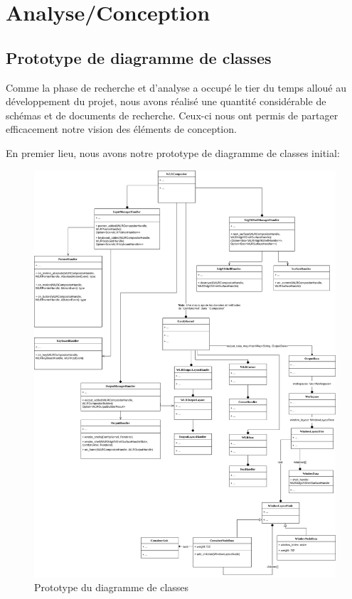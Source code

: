 \documentclass[titlepage]{article}
\begin{document}
\noindent\begin{minipage}{\linewidth}
\section{Analyse/Conception}
\subsection{Prototype de diagramme de classes}
\par
Comme la phase de recherche et d'analyse a occupé le tier du temps alloué au
développement du projet, nous avons réalisé une quantité considérable de schémas
et de documents de recherche. Ceux-ci nous ont permis de partager efficacement
notre vision des éléments de conception.
\bigskip

\par
En premier lieu, nous avons notre prototype de diagramme de classes initial:
\bigskip

\begin{figure}[H]
	\centering
	\includegraphics[width=\textwidth]{Diagramme_de_classes.jpg}
	\caption{Prototype du diagramme de classes}
\end{figure}
\end{minipage}
\end{document}
